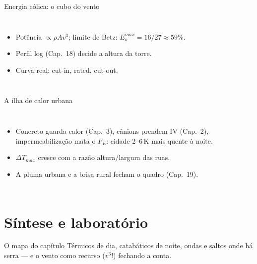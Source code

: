 \documentclass[aspectratio=169,11pt]{beamer}
\begin{document}
\begin{frame}{Energia eólica: o cubo do vento}
  \begin{columns}
    \begin{itemize}
      \item Potência $\propto \rho A v^3$; limite de Betz:
            $E_o^{max} = 16/27 \approx 59\%$.
      \item Perfil log (Cap.~18) decide a altura da torre.
      \item Curva real: cut-in, rated, cut-out.
    \end{itemize}
  \end{columns}
\end{frame}

\begin{frame}{A ilha de calor urbana}
  \begin{columns}
    \begin{itemize}
      \item Concreto guarda calor (Cap.~3), cânions prendem IV
            (Cap.~2), impermeabilização mata o $F_E$: cidade
            2--6\,K mais quente à noite.
      \item $\Delta T_{max}$ cresce com a razão altura/largura das
            ruas.
      \item A pluma urbana e a brisa rural fecham o quadro
            (Cap.~19).
    \end{itemize}
  \end{columns}
\end{frame}

\section{Síntese e laboratório}

\begin{frame}{O mapa do capítulo}
  \vspace{0.6em}
  Térmicos de dia, catabáticos de noite, ondas e saltos onde há serra —
  e o vento como recurso ($v^3$!) fechando a conta.
\end{frame}
\end{document}
